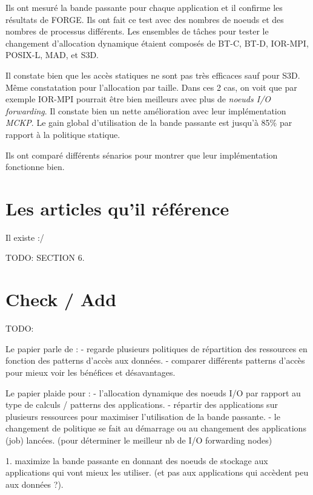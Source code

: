 \documentclass[10pt, a4paper]{article}
\begin{document}
Ils ont mesuré la bande passante pour chaque application et il confirme les résultats de FORGE. Ils ont fait ce test avec des nombres de noeuds et des nombres de processus différents.
Les ensembles de tâches pour tester le changement d'allocation dynamique étaient composés de BT-C, BT-D, IOR-MPI, POSIX-L, MAD, et S3D.

Il constate bien que les accès statiques ne sont pas très efficaces sauf pour S3D. Même constatation pour l'allocation par taille. Dans ces 2 cas, on voit que par exemple IOR-MPI pourrait être bien meilleurs avec plus de \emph{noeuds I/O forwarding}. Il constate bien un nette amélioration avec leur implémentation \emph{MCKP}. Le gain global d'utilisation de la bande passante est jusqu'à 85\% par rapport à la politique statique.

Ils ont comparé différents sénarios pour montrer que leur implémentation fonctionne bien.

\section{Les articles qu'il référence}

Il existe :/

TODO: SECTION 6.

\section{Check / Add}

TODO:

Le papier parle de :
- regarde plusieurs politiques de répartition des ressources en fonction des patterns d'accès aux données.
- comparer différents patterns d'accès pour mieux voir les bénéfices et désavantages.

Le papier plaide pour :
- l'allocation dynamique des noeuds I/O par rapport au type de calculs / patterns des applications.
- répartir des applications sur plusieurs ressources pour maximiser l'utilisation de la bande passante.
- le changement de politique se fait au démarrage ou au changement des applications (job) lancées. (pour déterminer le meilleur nb de I/O forwarding nodes)

1. maximize la bande passante en donnant des noeuds de stockage aux applications qui vont mieux les utiliser. (et pas aux applications qui accèdent peu aux données ?).


\nocite{*}
\end{document}
